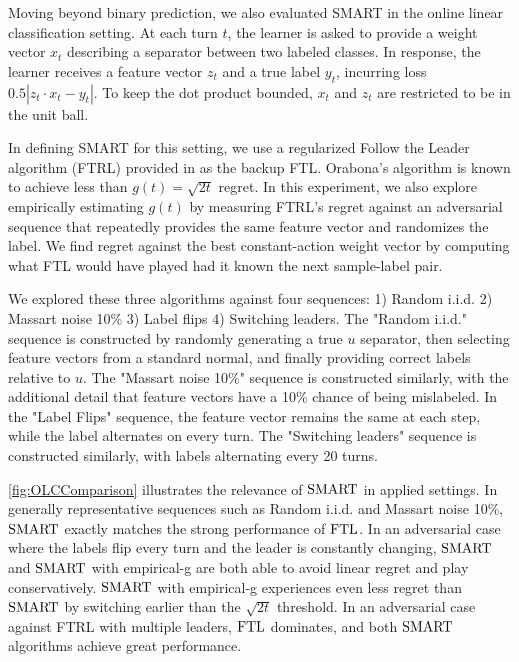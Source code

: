 \color{blue}
Moving beyond binary prediction, we also evaluated SMART in the online linear classification setting. At each turn $t$, the learner is asked to provide a weight vector $x_t$ describing a separator between two labeled classes. In response, the learner receives a feature vector $z_t$ and a true label $y_t$, incurring loss $0.5 |z_t \cdot x_t - y_t|$. To keep the dot product bounded, $x_t$ and $z_t$ are restricted to be in the unit ball. 

In defining SMART for this setting, we use a regularized Follow the Leader algorithm (FTRL) provided in \cite{orabona2019modern} as the backup FTL. Orabona's algorithm is known to achieve less than $g(t) = \sqrt{2t}$ regret. In this experiment, we also explore empirically estimating $g(t)$ by measuring FTRL's regret against an adversarial sequence that repeatedly provides the same feature vector and randomizes the label. We find regret against the best constant-action weight vector by computing what FTL would have played had it known the next sample-label pair. 

We explored these three algorithms against four sequences: 1) Random i.i.d. 2) Massart noise 10\% 3) Label flips 4) Switching leaders. The "Random i.i.d." sequence is constructed by randomly generating a true $u$ separator, then selecting feature vectors from a standard normal, and finally providing correct labels relative to $u$. The "Massart noise 10\%" sequence is constructed similarly, with the additional detail that feature vectors have a 10\% chance of being mislabeled. In the "Label Flips" sequence, the feature vector remains the same at each step, while the label alternates on every turn. The "Switching leaders" sequence is constructed similarly, with labels alternating every 20 turns.   

\cref{fig:OLCComparison} illustrates the relevance of $\text{SMART}$ in applied settings. In generally representative sequences such as Random i.i.d. and Massart noise 10\%, $\text{SMART}$ exactly matches the strong performance of $\text{FTL}$. In an adversarial case where the labels flip every turn and the leader is constantly changing, $\text{SMART}$ and $\text{SMART}$ with empirical-g are both able to avoid linear regret and play conservatively. $\text{SMART}$ with empirical-g experiences even less regret than $\text{SMART}$ by switching earlier than the $\sqrt{2t}$ threshold. In an adversarial case against FTRL with multiple leaders, $\text{FTL}$ dominates, and both $\text{SMART}$ algorithms achieve great performance.     

\color{black}

